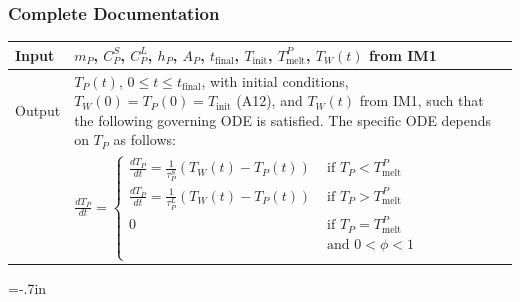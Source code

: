 \documentclass{beamer}
\newcommand{\colAwidth}{0.1\textwidth}
\newcommand{\colBwidth}{0.8\textwidth}
\begin{document}

\begin{frame}

\frametitle{Complete Documentation}

\noindent
\begin{minipage}{\columnwidth}
\begin{tabular}{@{} p{\colAwidth}  p{\colBwidth}@{}}
\toprule
Input&  $m_P$, $C_P^S$, $C_P^L$, $h_P$, $A_P$, $t_\text{final}$, $T_\text{init}$, $T_\text{melt}^P$,
$T_W(t)$ from IM1\\
\midrule
Output & $T_P(t)$, $0 \leq t \leq t_\text{final}$, with initial 
conditions, $T_W(0) = T_P(0) = T_\text{init}$ (A12), and $T_W(t)$ 
from IM1, such that the following governing ODE is satisfied.  The
specific ODE depends on $T_P$ as follows:\\
&  $
  \frac{dT_P}{dt} = \begin{cases}
  \frac{dT_P}{dt} = \frac{1}{\tau^S_P}(T_W(t) - T_P(t)) & \text { if } T_P<T_\text{melt}^P\\
  \frac{dT_P}{dt} = \frac{1}{\tau^L_P}(T_W(t) - T_P(t)) & \text { if } T_P>T_\text{melt}^P\\
  0 & \text { if }  T_P=T_\text{melt}^P \\
   ~ & \text{ and } 0 < \phi < 1\\
  \end{cases}
  $
\\
\bottomrule
\end{tabular}
\end{minipage}

\end{frame}


\hoffset=-.7in %
\end{document}
